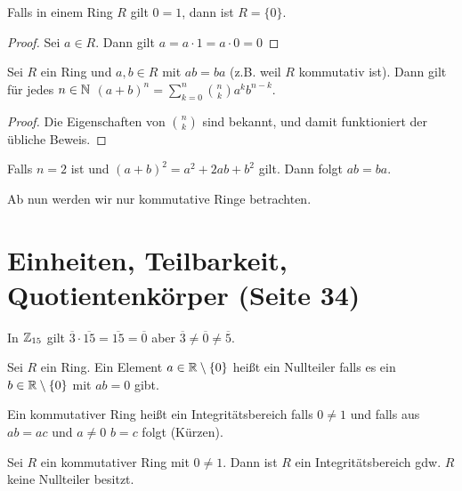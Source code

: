 \begin{lemma}
	Falls in einem Ring $R$ gilt $0=1$, dann ist  $R = \{0\}$.
\end{lemma}

\begin{proof}
	Sei $a \in R$. Dann gilt $a = a\cdot 1 = a \cdot 0 = 0$
\end{proof}

\begin{lemma}[Binomialformel]
	Sei $R$ ein Ring und $a,b \in R$ mit $ab = ba$ (z.B. weil $R$ kommutativ ist).
	Dann gilt für jedes $n \in \mathbb{N}$ $(a+b)^{n} = \sum_{k=0}^{n} \binom{n}{k} a^{k} b^{n-k}$.
\end{lemma}

\begin{proof}
	Die Eigenschaften von $\binom{n}{k}$ sind bekannt, und damit funktioniert der übliche Beweis.
\end{proof}

Falls $n = 2$ ist und $(a+b)^2 = a^2 + 2ab + b^2$ gilt. Dann folgt $ab = ba$.

\begin{attention}
Ab nun werden wir nur kommutative Ringe betrachten.
\end{attention}

\section{Einheiten, Teilbarkeit, Quotientenkörper (Seite 34)}
\begin{eg}
	In $\mathbb{Z}_{15}$ gilt $\overline{3} \cdot \overline{15} = \overline{15} = \overline{0}$ aber  $\overline{3} \neq \overline{0} \neq \overline{5}$.
\end{eg}

\begin{definition}
	Sei $R$ ein Ring. Ein Element $a \in \mathbb{R} \setminus \{0\}$ heißt ein Nullteiler falls es ein $b \in \mathbb{R} \setminus \{0\} $ mit $ab = 0$ gibt.
\end{definition}

\begin{definition}
	Ein kommutativer Ring heißt ein Integritätsbereich falls $0 \neq 1$ und falls aus $ab = ac$ und $a\neq 0$ $b = c$ folgt (Kürzen).
\end{definition}

\begin{lemma}
	Sei $R$ ein kommutativer Ring mit $0 \neq 1$. Dann ist $R$ ein Integritätsbereich gdw. $R$ keine Nullteiler besitzt.
\end{lemma}

